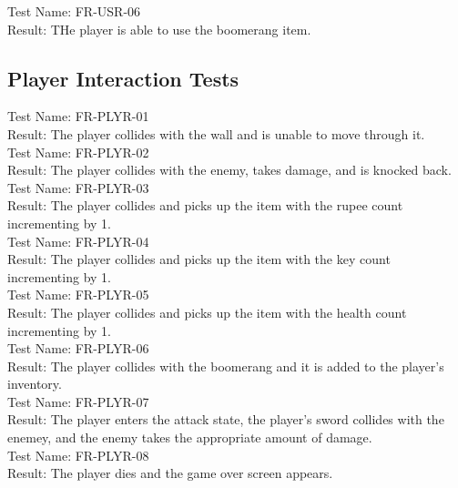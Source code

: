 \documentclass[12pt, titlepage]{article}
\begin{document}
Test Name: FR-USR-06\\

Result: THe player is able to use the boomerang item.\\

\subsection{Player Interaction Tests}

Test Name: FR-PLYR-01\\

Result: The player collides with the wall and is unable to move through it.\\

Test Name: FR-PLYR-02\\

Result: The player collides with the enemy, takes damage, and is knocked back.\\

Test Name: FR-PLYR-03\\

Result: The player collides and picks up the item with the rupee count incrementing by 1.\\

Test Name: FR-PLYR-04\\

Result: The player collides and picks up the item with the key count incrementing by 1.\\

Test Name: FR-PLYR-05\\

Result: The player collides and picks up the item with the health count incrementing by 1.\\

Test Name: FR-PLYR-06\\

Result: The player collides with the boomerang and it is added to the player's inventory.\\

Test Name: FR-PLYR-07\\

Result: The player enters the attack state, the player's sword collides with the enemey, and the enemy takes the appropriate amount of damage.\\

Test Name: FR-PLYR-08\\

Result: The player dies and the game over screen appears.\\
\end{document}
